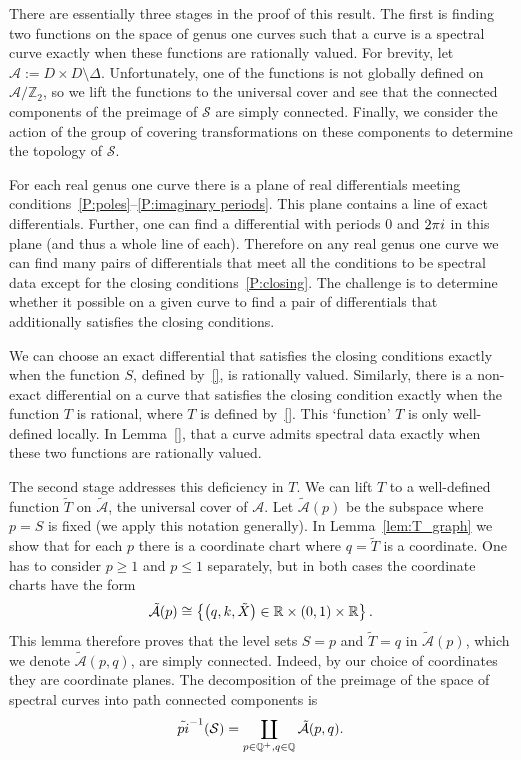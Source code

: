 \documentclass{article}
\begin{document}
There are essentially three stages in the proof of this result. The first is finding two functions on the space of genus one curves such that a curve is a spectral curve exactly when these functions are rationally valued. For brevity, let $\mathcal{A} := D\times D\setminus \Delta$. Unfortunately, one of the functions is not globally defined on $\mathcal{A}/\mathbb{Z}_2$, so we lift the functions to the universal cover and see that the connected components of the preimage of $\mathcal{S}$ are simply connected. Finally, we consider the action of the group of covering transformations on these components to determine the topology of $\mathcal{S}$.

For each real genus one curve there is a plane of real differentials meeting conditions~\ref{P:poles}--\ref{P:imaginary periods}.
This plane contains a line of exact differentials. 
Further, one can find a differential with periods $0$ and $2\pi i$ in this plane (and thus a whole line of each). 
Therefore on any real genus one curve we can find many pairs of differentials that meet all the conditions to be spectral data except for the closing conditions~\ref{P:closing}.
The challenge is to determine whether it possible on a given curve to find a pair of differentials that additionally satisfies the closing conditions.

We can choose an exact differential that satisfies the closing conditions exactly when the function $S$, defined by~\eqref{}, is rationally valued.
Similarly, there is a non-exact differential on a curve that satisfies the closing condition exactly when the function $T$ is rational, where $T$ is defined by~\ref{}. This `function' $T$ is only well-defined locally. In Lemma~\ref{}, that a curve admits spectral data exactly when these two functions are rationally valued.

The second stage addresses this deficiency in $T$. We can lift $T$ to a well-defined function $\tilde{T}$ on $\mathcal{\tilde{A}}$, the universal cover of $\mathcal{A}$. Let $\mathcal{\tilde{A}}(p)$ be the subspace where $p=S$ is fixed (we apply this notation generally). In Lemma~\ref{lem:T_graph} we show that for each $p$ there is a coordinate chart where $q=\tilde{T}$ is a coordinate. One has to consider $p \geq 1$ and $p \leq 1$ separately, but in both cases the coordinate charts have the form 
\[
\mathcal{\tilde{A}}(p) \cong \left\{ \left(q,k,\tilde{X}\right) \in \mathbb{R} \times (0,1) \times \mathbb{R} \right\}.
\]
This lemma therefore proves that the level sets $S = p$ and $\tilde{T} = q$ in $\mathcal{\tilde{A}}(p)$, which we denote $\mathcal{\tilde{A}}(p,q)$, are simply connected. Indeed, by our choice of coordinates they are coordinate planes. The decomposition of the preimage of the space of spectral curves into path connected components is
\[
\tilde{pi}^{-1}(\mathcal{S}) = \coprod_{p \in \mathbb{Q}^+, q\in\mathbb{Q}} \mathcal{\tilde{A}}(p,q).
\]
\end{document}
